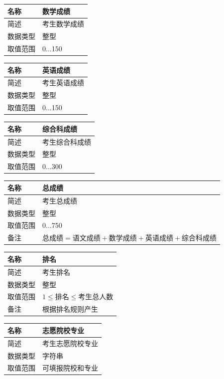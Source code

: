 \documentclass[CJK,utf8]{ctexrep}
\begin{document}
\begin{tabularx}{0.85\textwidth}{|l|X|}
	\hline
	名称 & 数学成绩 \\
	\hline
	简述 & 考生数学成绩 \\
	\hline
	数据类型 & 整型 \\
	\hline
	取值范围 & 0...150 \\
	\hline
\end{tabularx}

\begin{tabularx}{0.85\textwidth}{|l|X|}
	\hline
	名称 & 英语成绩 \\
	\hline
	简述 & 考生英语成绩 \\
	\hline
	数据类型 & 整型 \\
	\hline
	取值范围 & 0...150 \\
	\hline
\end{tabularx}

\begin{tabularx}{0.85\textwidth}{|l|X|}
	\hline
	名称 & 综合科成绩 \\
	\hline
	简述 & 考生综合科成绩 \\
	\hline
	数据类型 & 整型 \\
	\hline
	取值范围 & 0...300 \\
	\hline
\end{tabularx}

\begin{tabularx}{0.85\textwidth}{|l|X|}
	\hline
	名称 & 总成绩 \\
	\hline
	简述 & 考生总成绩 \\
	\hline
	数据类型 & 整型 \\
	\hline
	取值范围 & 0...750 \\
	\hline
	\multirow{2}{*}{备注} & $\text{总成绩}=\text{语文成绩}+\text{数学成绩}
	+\text{英语成绩}+\text{综合科成绩}$ \\
	\hline
\end{tabularx}

\begin{tabularx}{0.85\textwidth}{|l|X|}
	\hline
	名称 & 排名 \\
	\hline
	简述 & 考生排名 \\
	\hline
	数据类型 & 整型 \\
	\hline
	取值范围 & $1\le \text{排名} \le \text{考生总人数}$\\
	\hline
	备注 & 根据排名规则产生 \\
	\hline
\end{tabularx}

\begin{tabularx}{0.85\textwidth}{|l|X|}
	\hline
	名称 & 志愿院校专业 \\
	\hline
	简述 & 考生志愿院校专业 \\
	\hline
	数据类型 & 字符串 \\
	\hline
	取值范围 & 可填报院校和专业 \\
	\hline
\end{tabularx}
\end{document}
